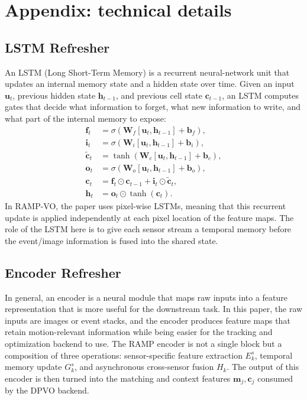 \documentclass[11pt]{article}
\begin{document}
\appendix

\section{Appendix: technical details}

\subsection{LSTM Refresher}

An LSTM (Long Short-Term Memory) is a recurrent neural-network unit that updates an internal memory state and a hidden state over time. Given an input \(\mathbf{u}_t\), previous hidden state \(\mathbf{h}_{t-1}\), and previous cell state \(\mathbf{c}_{t-1}\), an LSTM computes gates that decide what information to forget, what new information to write, and what part of the internal memory to expose:
\begin{align}
\mathbf{f}_t &= \sigma(\mathbf{W}_f[\mathbf{u}_t,\mathbf{h}_{t-1}] + \mathbf{b}_f), \\
\mathbf{i}_t &= \sigma(\mathbf{W}_i[\mathbf{u}_t,\mathbf{h}_{t-1}] + \mathbf{b}_i), \\
\tilde{\mathbf{c}}_t &= \tanh(\mathbf{W}_c[\mathbf{u}_t,\mathbf{h}_{t-1}] + \mathbf{b}_c), \\
\mathbf{o}_t &= \sigma(\mathbf{W}_o[\mathbf{u}_t,\mathbf{h}_{t-1}] + \mathbf{b}_o), \\
\mathbf{c}_t &= \mathbf{f}_t \odot \mathbf{c}_{t-1} + \mathbf{i}_t \odot \tilde{\mathbf{c}}_t, \\
\mathbf{h}_t &= \mathbf{o}_t \odot \tanh(\mathbf{c}_t).
\end{align}
In RAMP-VO, the paper uses pixel-wise LSTMs, meaning that this recurrent update is applied independently at each pixel location of the feature maps. The role of the LSTM here is to give each sensor stream a temporal memory before the event/image information is fused into the shared state.

\subsection{Encoder Refresher}

In general, an encoder is a neural module that maps raw inputs into a feature representation that is more useful for the downstream task. In this paper, the raw inputs are images or event stacks, and the encoder produces feature maps that retain motion-relevant information while being easier for the tracking and optimization backend to use. The RAMP encoder is not a single block but a composition of three operations: sensor-specific feature extraction \(E_k^s\), temporal memory update \(G_k^s\), and asynchronous cross-sensor fusion \(H_k\). The output of this encoder is then turned into the matching and context features \(\mathbf{m}_j,\mathbf{c}_j\) consumed by the DPVO backend.
\end{document}

